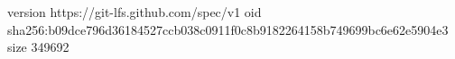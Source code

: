version https://git-lfs.github.com/spec/v1
oid sha256:b09dce796d36184527ccb038c0911f0c8b9182264158b749699bc6e62e5904e3
size 349692
